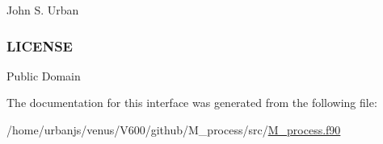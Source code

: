 John S. Urban \subsubsection*{L\+I\+C\+E\+N\+SE}

Public Domain 

The documentation for this interface was generated from the following file\+:\begin{DoxyCompactItemize}
\item 
/home/urbanjs/venus/\+V600/github/\+M\+\_\+process/src/\mbox{\hyperlink{M__process_8f90}{M\+\_\+process.\+f90}}\end{DoxyCompactItemize}
